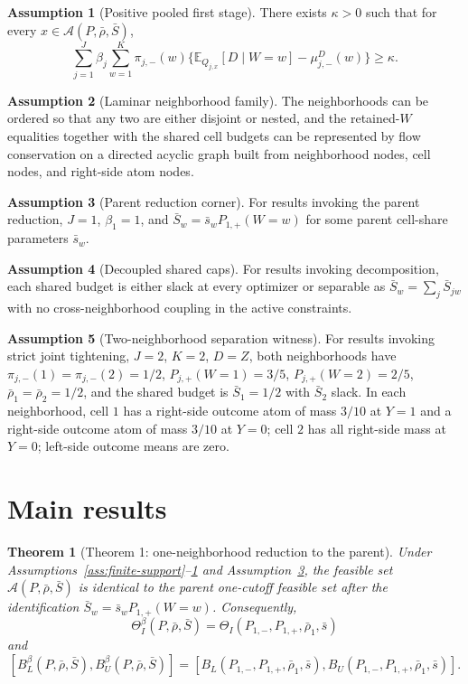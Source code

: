 \documentclass[11pt]{article}
\newcommand{\E}{\mathbb{E}}
\theoremstyle{definition}
\newtheorem{assumption}{Assumption}
\theoremstyle{plain}
\newtheorem{theorem}{Theorem}
\theoremstyle{remark}
\begin{document}
\begin{assumption}[Positive pooled first stage]\label{ass:first-stage}
There exists \(\kappa>0\) such that for every \(x\in\mathcal A(P,\bar\rho,\bar S)\),
\[
  \sum_{j=1}^J \beta_j
  \sum_{w=1}^K \pi_{j,-}(w)\{\E_{Q_{j,x}}[D\mid W=w]-\mu^D_{j,-}(w)\}\ge \kappa .
\]
\end{assumption}

\begin{assumption}[Laminar neighborhood family]\label{ass:laminar}
The neighborhoods can be ordered so that any two are either disjoint or nested, and the
retained-\(W\) equalities together with the shared cell budgets can be represented by flow
conservation on a directed acyclic graph built from neighborhood nodes, cell nodes, and right-side
atom nodes.
\end{assumption}

\begin{assumption}[Parent reduction corner]\label{ass:parent-corner}
For results invoking the parent reduction, \(J=1\), \(\beta_1=1\), and
\(\bar S_w=\bar s_w P_{1,+}(W=w)\) for some parent cell-share parameters \(\bar s_w\).
\end{assumption}

\begin{assumption}[Decoupled shared caps]\label{ass:decoupled}
For results invoking decomposition, each shared budget is either slack at every optimizer or
separable as \(\bar S_w=\sum_j \bar S_{jw}\) with no cross-neighborhood coupling in the active
constraints.
\end{assumption}

\begin{assumption}[Two-neighborhood separation witness]\label{ass:witness}
For results invoking strict joint tightening, \(J=2\), \(K=2\), \(D=Z\), both neighborhoods have
\(\pi_{j,-}(1)=\pi_{j,-}(2)=1/2\), \(P_{j,+}(W=1)=3/5\), \(P_{j,+}(W=2)=2/5\),
\(\bar\rho_1=\bar\rho_2=1/2\), and the shared budget is \(\bar S_1=1/2\) with \(\bar S_2\) slack.
In each neighborhood, cell \(1\) has a right-side outcome atom of mass \(3/10\) at \(Y=1\) and a
right-side outcome atom of mass \(3/10\) at \(Y=0\); cell \(2\) has all right-side mass at
\(Y=0\); left-side outcome means are zero.
\end{assumption}

\section{Main results}
\begin{theorem}[Theorem 1: one-neighborhood reduction to the parent]\label{thm:parent-reduction}
Under Assumptions~\ref{ass:finite-support}--\ref{ass:first-stage} and
Assumption~\ref{ass:parent-corner}, the feasible set \(\mathcal A(P,\bar\rho,\bar S)\) is
identical to the parent one-cutoff feasible set after the identification
\(\bar S_w=\bar s_w P_{1,+}(W=w)\). Consequently,
\[
  \Theta_I^\beta(P,\bar\rho,\bar S)
  =\Theta_I(P_{1,-},P_{1,+},\bar\rho_1,\bar s)
\]
and
\[
  [B_L^\beta(P,\bar\rho,\bar S),B_U^\beta(P,\bar\rho,\bar S)]
  =
  [B_L(P_{1,-},P_{1,+},\bar\rho_1,\bar s),B_U(P_{1,-},P_{1,+},\bar\rho_1,\bar s)] .
\]
\end{theorem}
\end{document}
